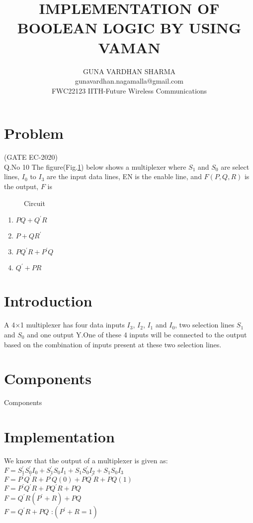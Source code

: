 \documentclass{article}
\title{IMPLEMENTATION OF BOOLEAN LOGIC BY USING VAMAN}
\author{GUNA VARDHAN SHARMA\\gunavardhan.nagamalla@gmail.com\\FWC22123 IITH-Future Wireless Communications }
\date{}
\begin{document}
\maketitle
\tableofcontents
\pagebreak

\section{Problem}                               
(GATE EC-2020)\\                                  
Q.No 10    The figure(Fig.\ref{fig:Circuit}) below shows a multiplexer where $S_1$ and $S_0$ are select lines, $I_0$ to $I_3$ are the input data lines, EN is the enable line, and $F(P,Q,R)$ is the output, $F$ is
\begin{figure}[!h]
\begin{center}

\end{center}
\caption{Circuit}
\label{fig:Circuit}
\end{figure}

\begin{enumerate}
   \item $PQ +{Q^\prime} R$
   \item $P+Q {R^\prime}$
   \item $P{Q^\prime} R+{P^\prime}Q$
   \item ${Q^\prime} +PR$
\end{enumerate}

\section{Introduction}
A 4×1 multiplexer has four data inputs $I_3$, $I_2$, $I_1$ and $I_0$, two selection lines $S_1$ and $S_0$ and one output Y.One of these 4 inputs will be connected to the output based on the combination of inputs present at these two selection lines. 

\section{Components}
\begin{table}[!h]
\centering

\caption{Components}
\label{table:Components}
\end{table}

\section{Implementation}
We know that the output of a multiplexer is given as: \\
$F=S_1^\prime S_0^\prime I_0+S_1^\prime S_0I_1+S_1S_0^\prime I_2+S_1S_0I_3$ \\ 
$F=P^\prime Q^\prime R+P^\prime Q(0)+PQ^\prime R+PQ(1)$ \\
$F=P^\prime Q^\prime R+PQ^\prime R+PQ$ \\
$F=Q^\prime R(P^\prime +R) +PQ$ \\
$F=Q^\prime R+PQ$     :$(P^\prime +R=1)$
\end{document}
